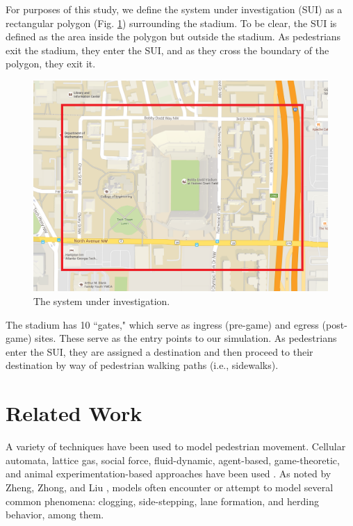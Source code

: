 \documentclass[12pt]{article}
\begin{document}
For purposes of this study, we define the system under investigation (SUI) as a
rectangular polygon (Fig. \ref{fig:polygon}) surrounding the stadium. To be clear,
the SUI is defined as the area inside the polygon but outside the stadium. As
pedestrians exit the stadium, they enter the SUI, and as they cross the boundary
of the polygon, they exit it.

\begin{figure}[H]
  \includegraphics[width=\linewidth,natwidth=1036,natheight=742]{cropped_map.png}
  \caption{The system under investigation.}
  \label{fig:polygon}
\end{figure}

The stadium has 10 “gates," which serve as ingress (pre-game) and egress
(post-game) sites. These serve as the entry points to our simulation. As
pedestrians enter the SUI, they are assigned a destination and then proceed
to their destination by way of pedestrian walking paths (i.e., sidewalks).

\section{Related Work}
\label{sec:literature}

A variety of techniques have been used to model pedestrian movement. Cellular
automata, lattice gas, social force, fluid-dynamic, agent-based, game-theoretic,
and animal experimentation-based approaches have been used
\cite{zheng2009modeling}. As noted by Zheng, Zhong, and Liu
\cite{zheng2009modeling}, models often encounter or attempt to model several
common phenomena: clogging, side-stepping, lane formation, and herding
behavior, among them.
\end{document}
